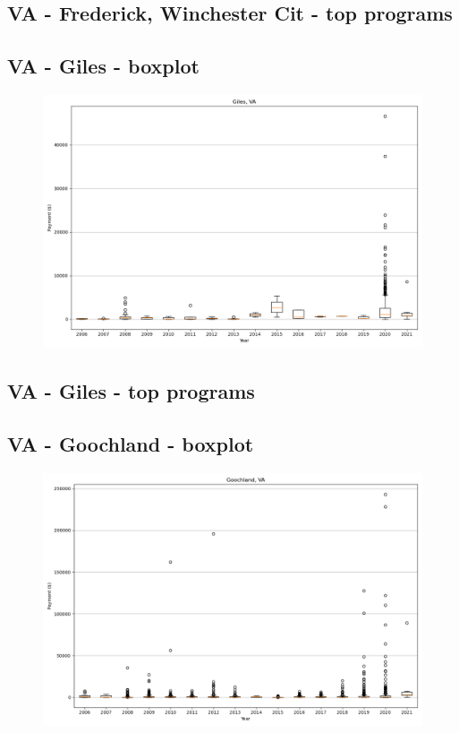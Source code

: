 \subsection*{VA - Frederick, Winchester Cit - top programs}

\newpage
\subsection*{VA - Giles - boxplot}
\begin{figure}[h]
\centering
\includegraphics[width=7in]{../output/boxplots/counties/Giles-VA_boxplot.png}
\end{figure}


\subsection*{VA - Giles - top programs}

\newpage
\subsection*{VA - Goochland - boxplot}
\begin{figure}[h]
\centering
\includegraphics[width=7in]{../output/boxplots/counties/Goochland-VA_boxplot.png}
\end{figure}


